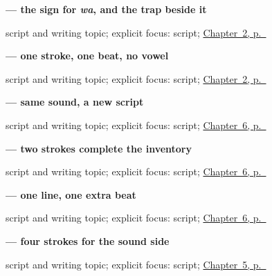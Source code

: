 \noindent\begin{minipage}[t]{\linewidth}
\raggedright
\textbf{ — the sign for \emph{wa}, and the trap beside it}\par
\footnotesize script and writing topic; explicit focus: script; \hyperref[ch:ja-daytime-greeting]{Chapter~2, p.~\pageref*{ch:ja-daytime-greeting}}
\end{minipage}\par\smallskip

\noindent\begin{minipage}[t]{\linewidth}
\raggedright
\textbf{ — one stroke, one beat, no vowel}\par
\footnotesize script and writing topic; explicit focus: script; \hyperref[ch:ja-daytime-greeting]{Chapter~2, p.~\pageref*{ch:ja-daytime-greeting}}
\end{minipage}\par\smallskip

\noindent\begin{minipage}[t]{\linewidth}
\raggedright
\textbf{ — same sound, a new script}\par
\footnotesize script and writing topic; explicit focus: script; \hyperref[ch:ja-koohii-katakana]{Chapter~6, p.~\pageref*{ch:ja-koohii-katakana}}
\end{minipage}\par\smallskip

\noindent\begin{minipage}[t]{\linewidth}
\raggedright
\textbf{ — two strokes complete the inventory}\par
\footnotesize script and writing topic; explicit focus: script; \hyperref[ch:ja-koohii-katakana]{Chapter~6, p.~\pageref*{ch:ja-koohii-katakana}}
\end{minipage}\par\smallskip

\noindent\begin{minipage}[t]{\linewidth}
\raggedright
\textbf{ — one line, one extra beat}\par
\footnotesize script and writing topic; explicit focus: script; \hyperref[ch:ja-koohii-katakana]{Chapter~6, p.~\pageref*{ch:ja-koohii-katakana}}
\end{minipage}\par\smallskip

\noindent\begin{minipage}[t]{\linewidth}
\raggedright
\textbf{ — four strokes for the sound side}\par
\footnotesize script and writing topic; explicit focus: script; \hyperref[ch:ja-nihongo-kanji]{Chapter~5, p.~\pageref*{ch:ja-nihongo-kanji}}
\end{minipage}\par\smallskip

